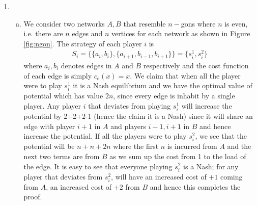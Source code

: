 \documentclass[a4paper,12pt]{article}
\theoremstyle{definition}
\begin{document}
\begin{enumerate}
\begin{enumerate}[(a)]
\begin{table}[h]
\footnotesize
\renewcommand{\arraystretch}{1.75}
    \centering
    \begin{tabular}{cc|c|c|}
      & \multicolumn{1}{c}{} & \multicolumn{2}{c}{Player $2$}\\
      & \multicolumn{1}{c}{} & \multicolumn{1}{c}{$A$}  & \multicolumn{1}{c}{$B$} \\\cline{3-4}
      \multirow{2}*{Player $1$}  & $A$ & $1,1$ & $2,2$ \\\cline{3-4}
      & $B$ & $3,3$ & $4,4$ \\\cline{3-4}
    \end{tabular}
    \caption{Partnership games}
\end{table}



\end{enumerate}


\item
\begin{enumerate}[(a)]
\item We consider two networks $A, B$ that resemble $n-$gons where $n$ is even, i.e. there are $n$ edges and $n$ vertices for each network as shown in Figure \ref{fig:ngon}. The strategy of each player $i$ is 
\begin{align*}
S_i=\{\{a_i,b_i\},\{a_{i+1},b_{i-1},b_{i+1}\}\}=\{s_i^1,s_i^2\}
\end{align*}
where $a_i,b_i$ denotes edges in $A$ and $B$ respectively and the cost function of each edge is simply $c_e(x)=x$. We claim that when all the player were to play $s_i^1$ it is a Nash equilibrium and we have the optimal value of potential which has value $2n$, since every edge is inhabit by a single player. Any player $i$ that deviates from playing $s_i^1$ will increase the potential by 2+2+2-1 (hence the claim it is a Nash) since it will share an edge with player $i+1$ in $A$ and players $i-1, i+1$ in $B$ and hence increase the potential. If all the players were to play $s_i^2$, we see that the potential will be $n+n+2n$ where the first $n$ is incurred from $A$ and the next two terms are from $B$ as we sum up the cost from 1 to the load of the edge. It is easy to see that everyone playing $s_i^2$ is a Nash; for any player that deviates from $s_i^2$, will have an increased cost of $+1$ coming from $A$, an increased cost of $+2$ from $B$ and hence this completes the proof. 



\newdimen\R
\R=2cm
\begin{figure}[h]
\centering
{}
\end{figure}
\end{enumerate}
\end{enumerate}
\end{document}
